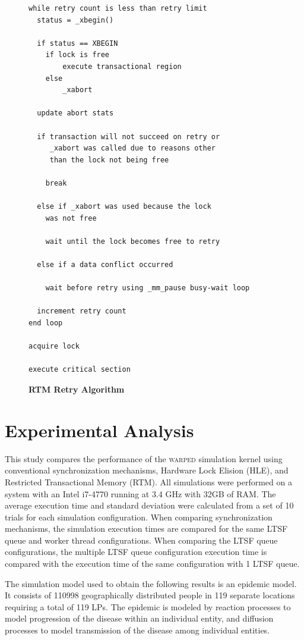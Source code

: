 \documentclass{sig-alternate}
\begin{document}
\begin{figure}
\begin{verbatim}
while retry count is less than retry limit
  status = _xbegin()

  if status == XBEGIN
    if lock is free
        execute transactional region
    else
        _xabort

  update abort stats

  if transaction will not succeed on retry or 
     _xabort was called due to reasons other 
     than the lock not being free

    break

  else if _xabort was used because the lock 
    was not free

    wait until the lock becomes free to retry

  else if a data conflict occurred
        
    wait before retry using _mm_pause busy-wait loop 

  increment retry count
end loop

acquire lock

execute critical section
\end{verbatim}
\caption{\textbf{RTM Retry Algorithm}}\label{rtm_retry}
\end{figure}

\section{Experimental Analysis}\label{eval}

This study compares the performance of the \textsc{warped} simulation kernel using
conventional synchronization mechanisms, Hardware Lock Elision (HLE), and Restricted
Transactional Memory (RTM).  All simulations were performed on a system with an Intel
i7-4770 running at 3.4 GHz with 32GB of RAM.  The average execution time and standard
deviation were calculated from a set of 10 trials for each simulation configuration.  When
comparing synchronization mechanisms, the simulation execution times are compared for the
same LTSF queue and worker thread configurations.  When comparing the LTSF queue
configurations, the multiple LTSF queue configuration execution time is compared with the
execution time of the same configuration with 1 LTSF queue.

The simulation model used to obtain the following results is an epidemic model.  It
consists of 110998 geographically distributed people in 119 separate locations requiring a
total of 119 LPs.  The epidemic is modeled by reaction processes to model progression of
the disease within an individual entity, and diffusion processes to model transmission of
the disease among individual entities.
\end{document}
